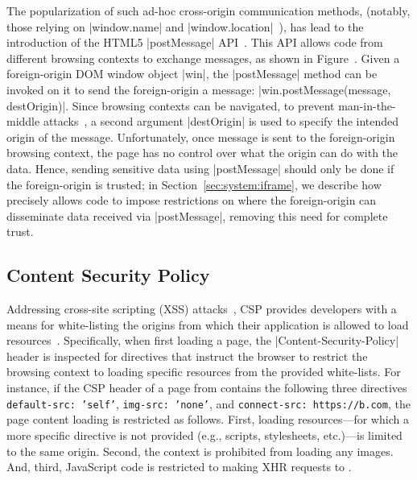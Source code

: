 The popularization of such ad-hoc cross-origin communication methods,
(notably, those relying on \js|window.name| and
\js|window.location|~\cite{thidpartyjs}), has lead to the
introduction of the HTML5 \js|postMessage| API~\cite{webmessaging}.
%
This API allows code from different browsing contexts to exchange
messages, as shown in Figure~.
%
Given a foreign-origin DOM window object \js|win|, the
\js|postMessage| method can be invoked on it to send the
foreign-origin a message: \js|win.postMessage(message, destOrigin)|.
%
Since browsing contexts can be navigated, to prevent man-in-the-middle
attacks~\cite{barth2009securing}, a second argument
\js|destOrigin| is used to specify the intended origin of the message.
%
Unfortunately, once message is sent to the foreign-origin browsing
context, the page has no control over what the origin can do with the
data.
%
Hence, sending sensitive data using \js|postMessage| should only be
done if the foreign-origin is trusted;
%
in Section~\ref{sec:system:iframe}, we describe how \sys{} precisely
allows code to impose restrictions on where the foreign-origin can
disseminate data received via \js|postMessage|, removing this need for
complete trust.

\subsection{Content Security Policy} 
\label{sec:background:csp}

Addressing cross-site scripting (XSS) attacks~\cite{kerschbaum2007simple}, CSP
provides developers with a means for white-listing the origins from which their
application is allowed to load resources~\cite{csp}.
%
Specifically, when first loading a page, the
\js|Content-Security-Policy| header is inspected for directives that
instruct the browser to restrict the browsing context to loading
specific resources from the provided white-lists.
%
For instance, if the CSP header of a page from  contains
the following three directives
%
\texttt{default-src: 'self'}, \texttt{img-src: 'none'}, and
\texttt{connect-src: https://b.com},
%
the page content loading is restricted as follows.
%
First, loading resources---for which a more specific directive is not
provided (e.g., scripts, stylesheets, etc.)---is limited to the same
origin.
%
Second, the context is prohibited from loading any images.
%
And, third, JavaScript code is restricted to making XHR requests to
.

